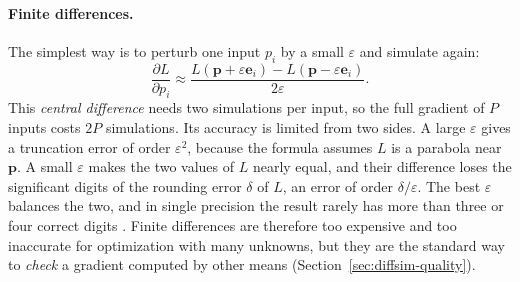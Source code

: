 \paragraph{Finite differences.}
The simplest way is to perturb one input $p_i$ by a small $\varepsilon$
and simulate again:
\begin{equation}
  \frac{\partial L}{\partial p_i}
  \approx \frac{L(\mathbf{p} + \varepsilon \mathbf{e}_i) - L(\mathbf{p} - \varepsilon \mathbf{e}_i)}{2\varepsilon} .
  \label{eq:diffsim-fd}
\end{equation}
This \emph{central difference} needs two simulations per input, so the full
gradient of $P$ inputs costs $2P$ simulations. Its accuracy is limited from
two sides. A large $\varepsilon$ gives a truncation error of order
$\varepsilon^2$, because the formula assumes $L$ is a parabola near
$\mathbf{p}$. A small $\varepsilon$ makes the two values of $L$ nearly
equal, and their difference loses the significant digits of the rounding
error $\delta$ of $L$, an error of order $\delta/\varepsilon$. The best
$\varepsilon$ balances the two, and in single precision the result rarely
has more than three or four correct digits
\citep{griewank2008evaluating}. Finite differences are therefore too
expensive and too inaccurate for optimization with many unknowns, but they
are the standard way to \emph{check} a gradient computed by other means
(Section~\ref{sec:diffsim-quality}).


